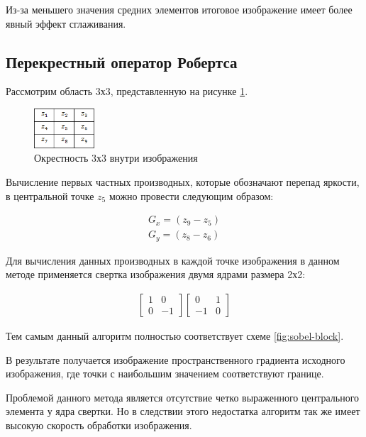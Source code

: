 Из-за меньшего значения средних элементов итоговое изображение имеет более явный эффект сглаживания.

\subsection{Перекрестный оператор Робертса}

Рассмотрим область 3х3, представленную на рисунке \ref{fig:roberst}.

\begin{figure}[!h]
	\centering
	\includegraphics[width=0.2\textwidth,keepaspectratio]{figures/ru/roberts}
	\caption{Окрестность 3х3 внутри изображения}
	\label{fig:roberst}
\end{figure}

Вычисление первых частных производных, которые обозначают перепад яркости, в центральной точке $z_5$ можно провести следующим образом:

\begin{eqnarray}\label{eq:roberts-eq}
G_x = (z_9 - z_5) \\
G_y = (z_8 - z_6)
\end{eqnarray}

Для вычисления данных производных в каждой точке изображения в данном методе\cite{Roberts} применяется свертка изображения двумя ядрами размера 2х2:

\begin{eqnarray}\label{eq:roberts-matrixs}
\begin{bmatrix}
1 & 0\\
0 & -1
\end{bmatrix} 
\begin{bmatrix}
0 & 1\\
-1 & 0
\end{bmatrix}
\end{eqnarray}

Тем самым данный алгоритм полностью соответствует схеме \ref{fig:sobel-block}.

В результате получается изображение пространственного градиента исходного изображения, где точки с наибольшим значением соответствуют границе.

Проблемой данного метода является отсутствие четко выраженного центрального элемента у ядра свертки. Но в следствии этого недостатка алгоритм так же имеет высокую скорость обработки изображения.

